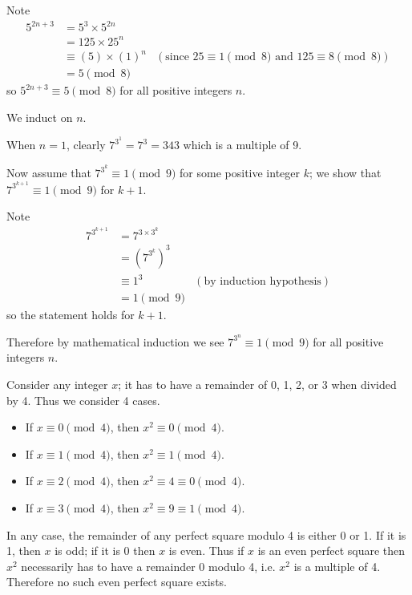 \begin{questions}
    \item Note
    \begin{align*}
        5^{2n+3} &= 5^3 \times 5^{2n}\\
        &= 125 \times 25^n \\
        &\equiv (5) \times (1)^n & (\text{since } 25 \equiv 1 \pmod8 \text{ and } 125 \equiv 8 \pmod8)\\
        &= 5 \pmod8
    \end{align*}
    so $5^{2n+3} \equiv 5 \pmod8$ for all positive integers $n$.

    \item We induct on $n$.
    
    When $n = 1$, clearly $7^{3^1} = 7^3 = 343$ which is a multiple of 9.

    Now assume that $7^{3^k} \equiv 1 \pmod9$ for some positive integer $k$; we show that $7^{3^{k+1}} \equiv 1 \pmod9$ for $k + 1$.

    Note
    \begin{align*}
        7^{3^{k+1}} &= 7^{3\times3^k}\\
        &= \left(7^{3^k}\right)^3\\
        &\equiv 1^3 & (\text{by induction hypothesis})\\
        &= 1 \pmod9
    \end{align*}
    so the statement holds for $k+1$.

    Therefore by mathematical induction we see $7^{3^n} \equiv 1 \pmod9$ for all positive integers $n$.

    \item Consider any integer $x$; it has to have a remainder of 0, 1, 2, or 3 when divided by 4. Thus we consider 4 cases.
    \begin{itemize}
        \item If $x \equiv 0 \pmod4$, then $x^2 \equiv 0 \pmod4$.
        \item If $x \equiv 1 \pmod4$, then $x^2 \equiv 1 \pmod4$.
        \item If $x \equiv 2 \pmod4$, then $x^2 \equiv 4 \equiv 0 \pmod4$.
        \item If $x \equiv 3 \pmod4$, then $x^2 \equiv 9 \equiv 1 \pmod4$.
    \end{itemize}
    In any case, the remainder of any perfect square modulo 4 is either 0 or 1. If it is 1, then $x$ is odd; if it is 0 then $x$ is even. Thus if $x$ is an even perfect square then $x^2$ necessarily has to have a remainder 0 modulo 4, i.e. $x^2$ is a multiple of 4. Therefore no such even perfect square exists.


\end{questions}
